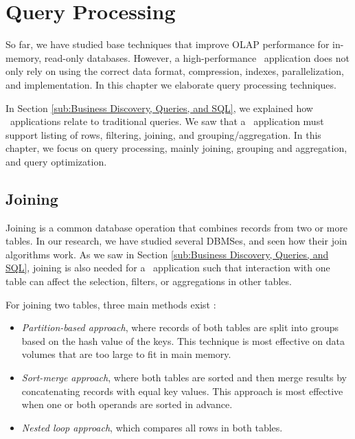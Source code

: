 \chapter{Query Processing}
\label{chap:Query Processing}
So far, we have studied base techniques that improve OLAP performance for in-memory, read-only databases. However, a high-performance \bd~application does not only rely on using the correct data format, compression, indexes, parallelization, and implementation. In this chapter we elaborate query processing techniques.

In Section \ref{sub:Business Discovery, Queries, and SQL}, we explained how \bd~applications relate to traditional queries. We saw that a \bd~application must support listing of rows, filtering, joining, and grouping/aggregation. In this chapter, we focus on query processing, mainly joining, grouping and aggregation, and query optimization.





\newpage

\section{Joining}
\label{sec:Joining}
Joining is a common database operation that combines records from two or more tables. In our research, we have studied several DBMSes, and seen how their join algorithms work. As we saw in Section \ref{sub:Business Discovery, Queries, and SQL}, joining is also needed for a \bd~application such that interaction with one table can affect the selection, filters, or aggregations in other tables.

For joining two tables, three main methods exist \cite{Bratbergsengen2015-ed}: 
\begin{itemize}
  \item \textit{Partition-based approach}, where records of both tables are split into groups based on the hash value of the keys. This technique is most effective on data volumes that are too large to fit in main memory.
  \item \textit{Sort-merge approach}, where both tables are sorted and then merge results by concatenating records with equal key values. This approach is most effective when one or both operands are sorted in advance.
  \item \textit{Nested loop approach}, which compares all rows in both tables.
\end{itemize}

